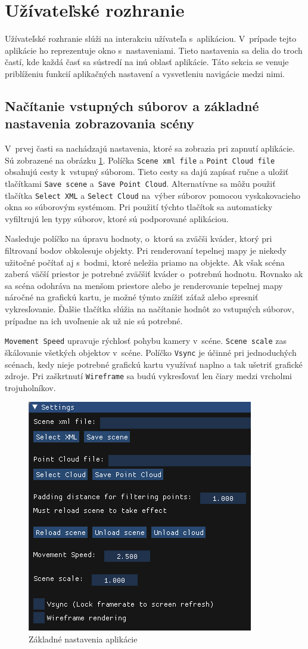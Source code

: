 \section{Užívateľské rozhranie}
\label{UINavrh}
Užívateľské rozhranie slúži na interakciu užívateľa s~aplikáciou. V~prípade tejto aplikácie ho reprezentuje okno s~nastaveniami. Tieto nastavenia sa delia do troch častí, kde každá časť sa sústredí na inú oblasť aplikácie. Táto sekcia se venuje priblíženiu funkcií aplikačných nastavení a vysvetleniu navigácie medzi nimi.

\subsection*{Načítanie vstupných súborov a základné nastavenia zobrazovania scény}
V~prvej časti sa nachádzajú nastavenia, ktoré sa zobrazia pri zapnutí aplikácie. Sú zobrazené na obrázku \ref{BSettings}. Políčka \verb|Scene xml file| a \verb|Point Cloud file| obsahujú cesty k~vstupný súborom. Tieto cesty sa dajú zapísať ručne a uložiť tlačítkami \verb|Save scene| a~\verb|Save Point Cloud|. Alternatívne sa môžu použiť tlačítka \verb|Select XML| a \verb|Select Cloud| na~výber súborov pomocou vyskakovacieho okna so súborovým systémom. Pri použití týchto tlačítok sa automaticky vyfiltrujú len typy súborov, ktoré sú podporované aplikáciou.

Nasleduje políčko na úpravu hodnoty, o~ktorú sa zväčši kváder, ktorý pri filtrovaní bodov obkolesuje objekty. Pri renderovaní tepelnej mapy je niekedy užitočné počítať aj s~bodmi, ktoré neležia priamo na objekte. Ak však scéna zaberá väčší priestor je potrebné zväčšiť kváder o~potrebnú hodnotu. Rovnako ak sa scéna odohráva na menšom priestore alebo je renderovanie tepelnej mapy náročné na grafickú kartu, je možné týmto znížiť záťaž alebo spresniť vykresľovanie. Ďalšie tlačítka slúžia na načítanie hodnôt zo vstupných súborov, prípadne na ich uvoľnenie ak už nie sú potrebné.

\verb|Movement Speed| upravuje rýchlosť pohybu kamery v~scéne. \verb|Scene scale| zas škálovanie všetkých objektov v~scéne. Políčko \verb|Vsync| je účinné pri jednoduchých scénach, kedy nieje potrebné grafickú kartu využívať naplno a tak ušetriť grafické zdroje. Pri zaškrtnutí \verb|Wireframe| sa budú vykresľovať len čiary medzi vrcholmi trojuholníkov.
\begin{figure}[b!] \label{BSettings}
    \centering
    \includegraphics[width=0.40\linewidth]{obrazky-figures/UI_Start.png}
    \caption{Základné nastavenia aplikácie}
\end{figure}

